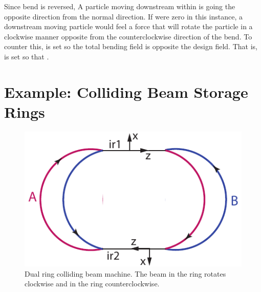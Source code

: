Since bend  is reversed, A particle moving downstream within
 is going the opposite direction from the normal direction. If
 were zero in this instance, a downstream moving particle
would feel a force that will rotate the particle in a clockwise manner
opposite from the counterclockwise direction of the bend. To counter
this,  is set so the total bending field  is opposite the design field. That is,  is set so
that .


\section{Example: Colliding Beam Storage Rings}
\label{s:ex.collide}

\begin{figure}[tb]
  \centering
  \includegraphics[width=5in]{colliding-beams.pdf}
  \caption[Dual ring colliding beam machine]{Dual ring colliding beam machine. 
The beam in the  ring rotates clockwise and in the  ring
counterclockwise.}
  \label{f:collide}
\end{figure}

